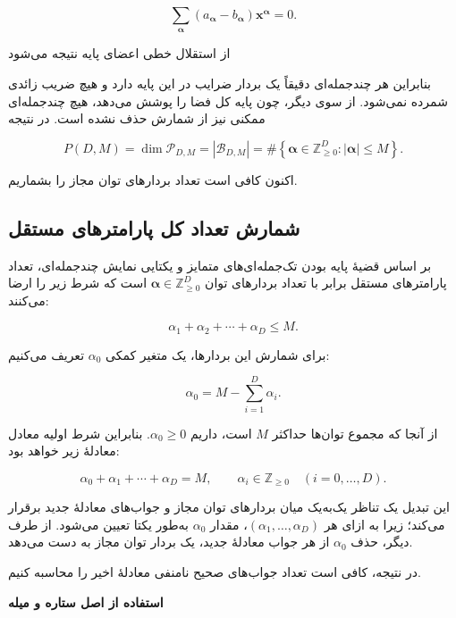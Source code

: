 \documentclass[12pt,a4paper]{article}
\newcommand{\en}[1]{\lr{#1}}
\begin{document}
\[
\sum_{\boldsymbol{\alpha}}
(a_{\boldsymbol{\alpha}}-b_{\boldsymbol{\alpha}})
\mathbf{x}^{\boldsymbol{\alpha}}=0.
\]

از استقلال خطی اعضای پایه نتیجه می‌شود

\begin{center}
\end{center}

بنابراین هر چندجمله‌ای دقیقاً یک بردار ضرایب
در این پایه دارد و هیچ ضریب زائدی شمرده نمی‌شود.
از سوی دیگر، چون پایه کل فضا را پوشش می‌دهد،
هیچ چندجمله‌ای ممکنی نیز از شمارش حذف نشده است.
در نتیجه

\[
\boxed{
P(D,M)=\dim\mathcal{P}_{D,M}
=|\mathcal{B}_{D,M}|
=\#\!\left\{\boldsymbol{\alpha}\in\mathbb{Z}_{\geq0}^{D}:
|\boldsymbol{\alpha}|\leq M\right\}.
}
\]

اکنون کافی است تعداد بردارهای توان مجاز را بشماریم.


\subsection{شمارش تعداد کل پارامترهای مستقل}

بر اساس قضیۀ پایه بودن تک‌جمله‌ای‌های متمایز
و یکتایی نمایش چندجمله‌ای، تعداد پارامترهای مستقل
برابر با تعداد بردارهای توان
$\boldsymbol{\alpha}\in\mathbb{Z}_{\geq 0}^{D}$
است که شرط زیر را ارضا می‌کنند:

\[
\alpha_1+\alpha_2+\cdots+\alpha_D\leq M.
\]

برای شمارش این بردارها، یک متغیر کمکی
$\alpha_0$ تعریف می‌کنیم:

\[
\alpha_0=M-\sum_{i=1}^{D}\alpha_i.
\]

از آنجا که مجموع توان‌ها حداکثر $M$ است،
داریم $\alpha_0\geq 0$.
بنابراین شرط اولیه معادل معادلۀ زیر خواهد بود:

\[
\alpha_0+\alpha_1+\cdots+\alpha_D=M,
\qquad
\alpha_i\in\mathbb{Z}_{\geq0}
\quad (i=0,\ldots,D).
\]

این تبدیل یک تناظر یک‌به‌یک میان
بردارهای توان مجاز و جواب‌های معادلۀ جدید
برقرار می‌کند؛ زیرا به ازای هر
$(\alpha_1,\ldots,\alpha_D)$،
مقدار $\alpha_0$ به‌طور یکتا تعیین می‌شود.
از طرف دیگر، حذف $\alpha_0$ از هر جواب
معادلۀ جدید، یک بردار توان مجاز به دست می‌دهد.

در نتیجه، کافی است تعداد جواب‌های صحیح
نامنفی معادلۀ اخیر را محاسبه کنیم.

\par\medskip
\noindent
{\bfseries استفاده از اصل ستاره و میله
\LTRfootnote{\en{Stars and Bars}}}
\par\smallskip
\end{document}
